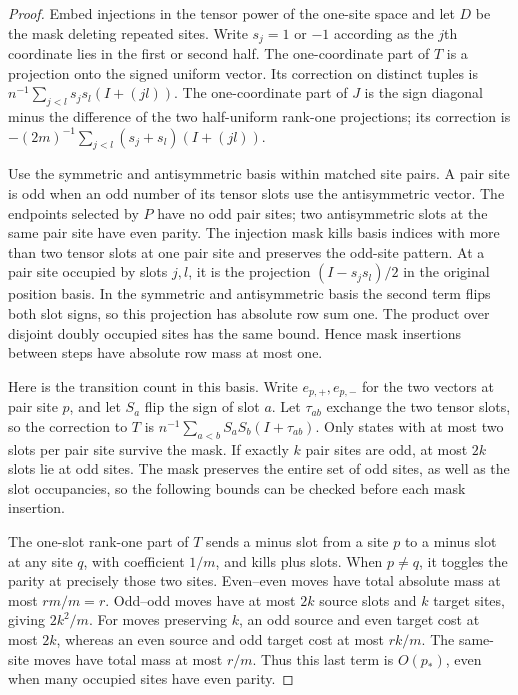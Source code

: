 \begin{proof}
Embed injections in the tensor power of the one-site space and let
$D$ be the mask deleting repeated sites.  Write $s_j=1$ or $-1$
according as the $j$th coordinate lies in the first or second half.
The one-coordinate part of $T$ is a projection onto the signed uniform
vector.  Its correction on distinct tuples is
$n^{-1}\sum_{j<l}s_js_l(I+(jl))$.
The one-coordinate part of $J$ is the sign diagonal minus the
difference of the two half-uniform rank-one projections; its correction
is $-(2m)^{-1}\sum_{j<l}(s_j+s_l)(I+(jl))$.

Use the symmetric and antisymmetric basis within matched site pairs.
A pair site is odd when an odd number of its tensor slots use the
antisymmetric vector.  The endpoints selected by $P$ have no odd pair
sites; two antisymmetric slots at the same pair site have even parity.
The injection mask kills basis indices with more than two tensor slots
at one pair site and preserves the odd-site pattern.  At a pair site
occupied by slots $j,l$, it is the projection
$(I-s_js_l)/2$ in the original position basis.  In the symmetric and
antisymmetric basis the second term flips both slot signs, so this
projection has absolute row sum one.  The product over disjoint doubly
occupied sites has the same bound.  Hence mask insertions between steps
have absolute row mass at most one.

Here is the transition count in this basis.  Write $e_{p,+},e_{p,-}$
for the two vectors at pair site $p$, and let $S_a$ flip the sign of
slot $a$.  Let $\tau_{ab}$ exchange the two tensor slots, so the
correction to $T$ is $n^{-1}\sum_{a<b}S_aS_b(I+\tau_{ab})$.
Only states with at most two slots per pair site survive the mask.
If exactly $k$ pair sites are odd, at most $2k$ slots lie at odd sites.
The mask preserves the entire set of odd sites, as well as the slot
occupancies, so the following bounds can be checked before each mask
insertion.

The one-slot rank-one part of $T$ sends a minus slot from a site $p$
to a minus slot at any site $q$, with coefficient $1/m$, and kills
plus slots.  When $p\ne q$, it toggles the parity at precisely those
two sites.  Even--even moves have total absolute mass at most
$rm/m=r$.  Odd--odd moves have at most $2k$ source slots and $k$
target sites, giving $2k^2/m$.  For moves preserving $k$, an odd
source and even target cost at most $2k$, whereas an even source and
odd target cost at most $rk/m$.  The same-site moves have total mass
at most $r/m$.  Thus this last term is $O(p_*)$, even when many
occupied sites have even parity.


\end{proof}
